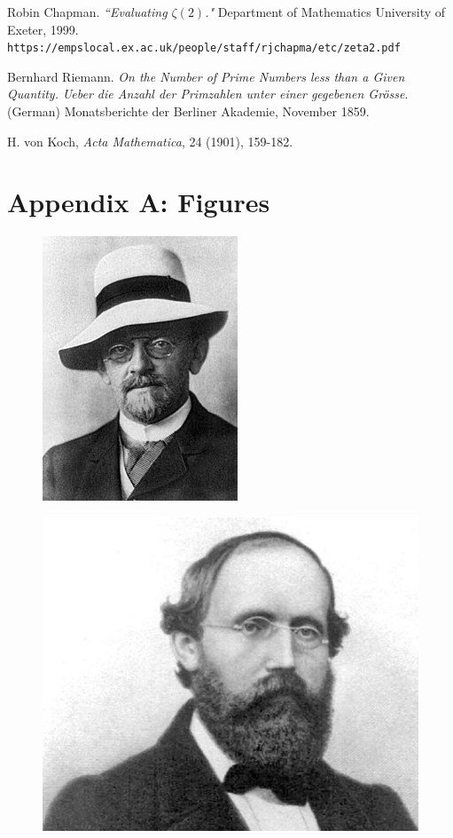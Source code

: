 \documentclass[12pt]{article}
\theoremstyle{plain}
\begin{document}
	
	


	\newpage

	\begin{thebibliography}{9}
		Robin Chapman. \textit{``Evaluating $ \zeta(2) $."} Department of Mathematics University of Exeter, 1999.
		\verb|https://empslocal.ex.ac.uk/people/staff/rjchapma/etc/zeta2.pdf|
		
		Bernhard Riemann. \textit{On the Number of Prime Numbers less than a Given Quantity.} 
		\textit{Ueber die Anzahl der Primzahlen unter
			einer gegebenen Gr\"{o}sse}. (German) 
		Monatsberichte der Berliner Akademie, November 1859.
		
		H. von Koch, \textit{Acta Mathematica}, 24 (1901), 159-182. 
	\end{thebibliography}

	
	\newpage
	
	\section*{Appendix A: Figures}
	
	
	\begin{figure}[h!]
		\centering
		\begin{minipage}{.5\textwidth}
			\centering
			\includegraphics[width=.4\linewidth]{hilbert.jpg}
			\label{fig:hilbert}
		\end{minipage}%
		\begin{minipage}{.5\textwidth}
			\centering
			\includegraphics[width=.4\linewidth]{riemann.jpg}
			\label{fig:riemann}
		\end{minipage}
	\end{figure}
\end{document}

